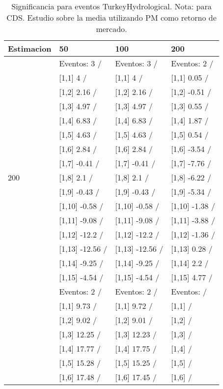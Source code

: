 \begin{table}

\caption{Significancia para eventos TurkeyHydrological. Nota: para CDS. Estudio sobre la media utilizando PM como retorno de mercado.}
\centering
\begin{tabular}[t]{llll}
\toprule
Estimacion & 50 & 100 & 200\\
\midrule
 & Eventos:  3 / & Eventos:  3 / & Eventos:  2 /\\
 & {}[1,1] 4  / & {}[1,1] 4  / & {}[1,1] 0.05  /\\
 & {}[1,2] 2.16  / & {}[1,2] 2.16  / & {}[1,2] -0.51  /\\
 & {}[1,3] 4.97  / & {}[1,3] 4.97  / & {}[1,3] 0.55  /\\
 & {}[1,4] 6.83  / & {}[1,4] 6.83  / & {}[1,4] 1.87  /\\
\addlinespace
 & {}[1,5] 4.63  / & {}[1,5] 4.63  / & {}[1,5] 0.54  /\\
 & {}[1,6] 2.84  / & {}[1,6] 2.84  / & {}[1,6] -3.54  /\\
 & {}[1,7] -0.41  / & {}[1,7] -0.41  / & {}[1,7] -7.76  /\\
200 & {}[1,8] 2.1  / & {}[1,8] 2.1  / & {}[1,8] -6.22  /\\
 & {}[1,9] -0.43  / & {}[1,9] -0.43  / & {}[1,9] -5.34  /\\
\addlinespace
 & {}[1,10] -0.58  / & {}[1,10] -0.58  / & {}[1,10] -1.38  /\\
 & {}[1,11] -9.08  / & {}[1,11] -9.08  / & {}[1,11] -3.88  /\\
 & {}[1,12] -12.2  / & {}[1,12] -12.2  / & {}[1,12] -1.36  /\\
 & {}[1,13] -12.56  / & {}[1,13] -12.56  / & {}[1,13] 0.28  /\\
 & {}[1,14] -9.25  / & {}[1,14] -9.25  / & {}[1,14] 2.2  /\\
\addlinespace
 & {}[1,15] -4.54  / & {}[1,15] -4.54  / & {}[1,15] 4.77  /\\
 & Eventos:  2 / & Eventos:  2 / & Eventos:   /\\
 & {}[1,1] 9.73  / & {}[1,1] 9.72  / & {}[1,1]  /\\
 & {}[1,2] 9.02  / & {}[1,2] 9.01  / & {}[1,2]  /\\
 & {}[1,3] 12.25  / & {}[1,3] 12.23  / & {}[1,3]  /\\
\addlinespace
 & {}[1,4] 17.77  / & {}[1,4] 17.75  / & {}[1,4]  /\\
 & {}[1,5] 15.28  / & {}[1,5] 15.25  / & {}[1,5]  /\\
 & {}[1,6] 17.48  / & {}[1,6] 17.45  / & {}[1,6]  /\\

\end{tabular}
\end{table}
